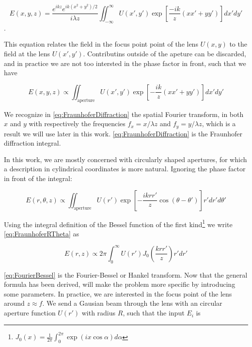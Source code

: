 \begin{mdframed}
    \begin{equation}\label{eq:FraunhoferDiffraction}
        E(x, y, z)=\frac{e^{i k z} e^{i k\left(x^{2}+y^{2}\right)/2}}{i \lambda z} \iint_{-\infty}^{\infty} U(x', y') \exp \left[\frac{-ik}{z}(x x'+y y')\right] dx' dy'
    \end{equation}. 
    
    This equation relates the field in the focus point point of the lens $U(x,y)$ to the field at the lens $U(x',y')$. 
    Contributins outside of the apeture can be discarded, and in practice we are not too intersted in the phase factor in front, such that we have
    
    \begin{equation}\label{eq:FraunhoferSimplified}
        E(x,y,z) \propto 
        \iint_{\text{aperture}} U(x',y') \exp{\left[- \frac{ik}{z}(xx'+yy')\right]}dx'dy'
    \end{equation}
    
    We recognize in \cref{eq:FraunhoferDiffraction} the spatial Fourier transform, in both $x$ and $y$ with respectively the frequencies $f_x = x/\lambda z$ and $f_y = y/\lambda z$, which is a result we will use later in this work. \cref{eq:FraunhoferDiffraction} is the Fraunhofer diffraction integral.
\end{mdframed}

 In this work, we are mostly concerned with circularly shaped apertures, for which a description in cylindrical coordinates is more natural.
 Ignoring the phase factor in front of the integral:

\begin{equation}\label{eq:FraunhoferRTheta}
    E(r,\theta, z) \propto \iint_{\text{aperture}} U(r') \exp{\left[
    -\frac{i k r r'}{z} \cos{(\theta-\theta')} 
    \right]}r'dr'd\theta'
\end{equation}

Using the integral definition of the Bessel function of the first kind\footnote{$J_0(x) = \frac{1}{2\pi} \int_0^{2\pi} \exp{(i x \cos{\alpha})} d\alpha$} we write \cref{eq:FraunhoferRTheta} as 

\begin{equation}\label{eq:FourierBessel}
    E(r,z) \propto 2\pi \int_0^{\infty} U(r') J_0\left( \frac{k r r'}{z}\right) r'dr'
\end{equation}

\cref{eq:FourierBessel} is the Fourier-Bessel or Hankel transform.
Now that the general formula has been derived, will make the problem more specific by introducing some parameters. 
In practice, we are interested in the focus point of the lens around $z \approx f$. 
We send a Gausian beam through the lens with an circular aperture function $U(r')$ with radius $R$, such that the input $E_i$ is

